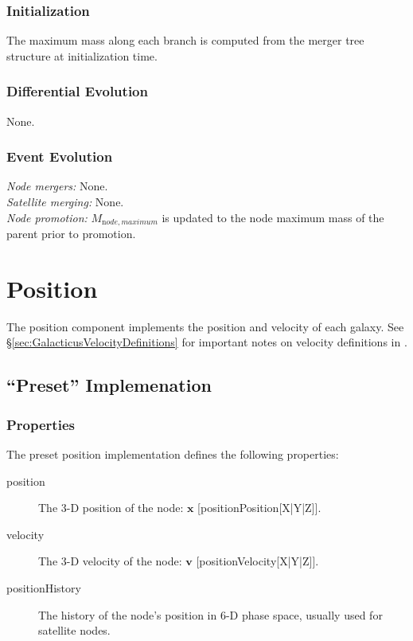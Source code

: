 \subsubsection{Initialization}

The maximum mass along each branch is computed from the merger tree structure at initialization time.

\subsubsection{Differential Evolution}

None.

\subsubsection{Event Evolution}

\noindent\emph{Node mergers:} None.\\

\noindent\emph{Satellite merging:} None.\\

\noindent\emph{Node promotion:} $M_{\mathrm node, maximum}$ is updated to the \gls{node} maximum mass of the parent prior to promotion.\\

\section{Position}\label{sec:ComponentPosition}

The position \gls{component} implements the position and velocity of each galaxy. See \S\ref{sec:GalacticusVelocityDefinitions} for important notes on velocity definitions in \glc.

\subsection{``Preset'' Implemenation}

\subsubsection{Properties}

The preset position implementation defines the following properties:
\begin{description}
 \item [{\normalfont \ttfamily position}] The 3-D position of the node: ${\mathbf x}$ [{\normalfont \ttfamily positionPosition[X|Y|Z]}].
 \item [{\normalfont \ttfamily velocity}] The 3-D velocity of the node: ${\mathbf v}$ [{\normalfont \ttfamily positionVelocity[X|Y|Z]}].
 \item [{\normalfont \ttfamily positionHistory}] The history of the node's position in 6-D phase space, usually used for satellite nodes.
\end{description}

